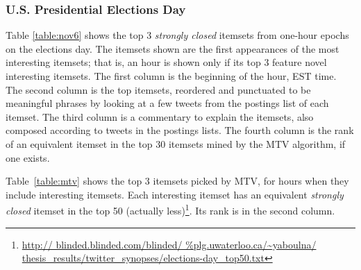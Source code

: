\documentclass{sig-alternate}
\begin{document}
\subsubsection{U.S. Presidential Elections Day}
Table \ref{table:nov6} shows the top 3 \emph{strongly closed} itemsets
from one-hour epochs on the elections day.
The itemsets shown are the first appearances of the most interesting itemsets;
that is, an hour is shown only if its top 3 feature novel interesting itemsets.
The first column is the beginning of the hour, EST time.
The second column is the top itemsets, 
reordered and punctuated to be meaningful phrases 
by looking at a few tweets from the postings list of each itemset.
The third column is a commentary to explain the itemsets,
also composed according to tweets in the postings lists.
The fourth column is the rank of an equivalent itemset 
in the top 30 itemsets mined by the MTV algorithm, if one exists.

Table~\ref{table:mtv} shows the top 3 itemsets picked by MTV, 
for hours when they include interesting itemsets.
Each interesting itemset has
an equivalent \emph{strongly closed} itemset in the top 50 (actually less)\footnote{\scriptsize \url{http://
blinded.blinded.com/blinded/
thesis_results/twitter_synopses/elections-day_top50.txt}}.
Its rank is in the second column.
\end{document}
